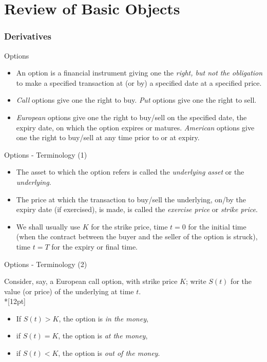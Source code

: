 
\part{Review of Basic Objects}

\section{Derivatives}

{Options}

\begin{itemize}
 \item<1->  An option is a financial instrument giving one the {\it right, but
not the obligation} to make a specified transaction at (or by) a
specified date at a specified price.
\item<2->{\it Call} options give one
the right to buy. {\it Put} options give one the right to sell.
\item<3-> {\it European} options give one the right to buy/sell on the
specified date, the expiry date, on which the option expires or
matures. {\it American} options give one the right to buy/sell at any time
prior to or at expiry.
\end{itemize}

{Options - Terminology (1)}

\begin{itemize}
\item<1-> The asset to which the option refers is called the {\it underlying
asset} or the {\it underlying}.
\item<2->
The price at which the transaction
to buy/sell the underlying, on/by the expiry date (if exercised),
is made, is called the {\it exercise price} or {\it strike price}.
\item<3-> We shall usually use $K$ for the strike price, time $t = 0$ for
the initial time (when the contract between the buyer and the
seller of the option is struck), time $t = T$ for the expiry or
final time.
\end{itemize}

{Options - Terminology (2)}

Consider, say, a European call option, with strike price $K$;
write $S(t)$ for the value (or price) of the underlying at time
$t$.\\*[12pt]
\begin{itemize}
  \item<1-> If $S(t) > K$, the option is {\it in the money},
  \item<2-> if $S(t) = K$, the option is {\it at the money},
  \item<3-> if $S(t) < K$, the option is {\it out of the money}.
\end{itemize}

